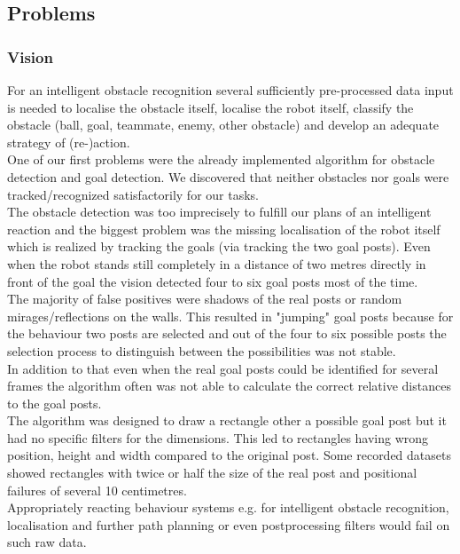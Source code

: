 \documentclass[lnicst,a4paper]{svmultln}
\begin{document}

\subsection{Problems}

\subsubsection{Vision}
For an intelligent obstacle recognition several sufficiently pre-processed data input is needed to localise the obstacle itself, localise the robot itself, classify the obstacle (ball, goal, teammate, enemy, other obstacle) and develop an adequate strategy of (re-)action.
\\
One of our first problems were the already implemented algorithm for obstacle detection and goal detection. We discovered that neither obstacles nor goals were tracked/recognized satisfactorily for our tasks.
\\
The obstacle detection was too imprecisely to fulfill our plans of an intelligent reaction and the biggest problem was the missing localisation of the robot itself which is realized by tracking the goals (via tracking the two goal posts). Even when the robot stands still completely in a distance of two metres directly in front of the goal the vision detected four to six goal posts most of the time.
\\
The majority of false positives were shadows of the real posts or random mirages/reflections on the walls. This resulted in "jumping" goal posts because for the behaviour two posts are selected and out of the four to six possible posts the selection process to distinguish between the possibilities was not stable.
\\
In addition to that even when the real goal posts could be identified for several frames the algorithm often was not able to calculate the correct relative distances to the goal posts.
\\
The algorithm was designed to draw a rectangle other a possible goal post but it had no specific filters for the dimensions. This led to rectangles having wrong position, height and width compared to the original post. Some recorded datasets showed rectangles with twice or half the size of the real post and positional failures of several 10 centimetres.
\\
Appropriately reacting behaviour systems e.g. for intelligent obstacle recognition, localisation and further path planning or even postprocessing filters would fail on such raw data.
\end{document}

